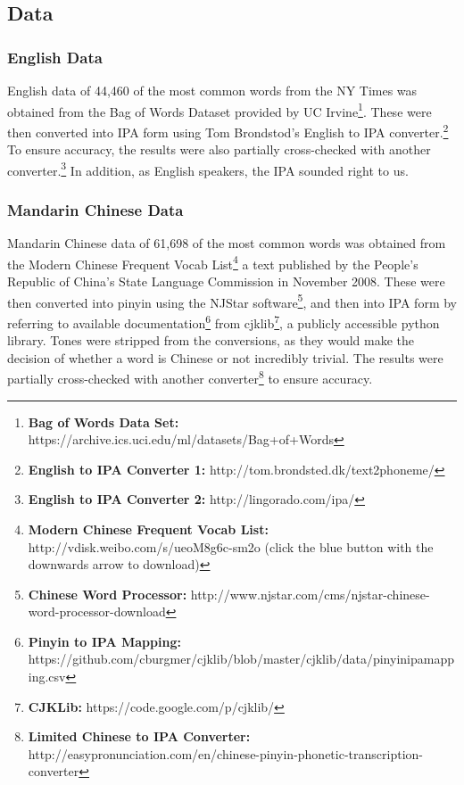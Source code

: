 \documentclass[a4paper]{article}
\begin{document}
\subsection{Data}
\subsubsection{English Data}
English data of 44,460 of the most common words from the NY Times was obtained from the Bag of Words Dataset provided by UC Irvine\footnote{\textbf{Bag of Words Data Set:} https://archive.ics.uci.edu/ml/datasets/Bag+of+Words}. These were then converted into IPA form using Tom Brondstod's English to IPA converter.\footnote{\textbf{English to IPA Converter 1:} http://tom.brondsted.dk/text2phoneme/} To ensure accuracy, the results were also partially cross-checked with another converter.\footnote{\textbf{English to IPA Converter 2: }http://lingorado.com/ipa/} In addition, as English speakers, the IPA sounded right to us.
\subsubsection{Mandarin Chinese Data}
Mandarin Chinese data of 61,698 of the most common words was obtained from the Modern Chinese Frequent Vocab List\footnote{\textbf{Modern Chinese Frequent Vocab List: }http://vdisk.weibo.com/s/ueoM8g6c-sm2o (click the blue button with the downwards arrow to download)} a text published by the People's Republic of China's State Language Commission in November 2008. These were then converted into pinyin using the NJStar software\footnote{\textbf{Chinese Word Processor: }http://www.njstar.com/cms/njstar-chinese-word-processor-download}, and then into IPA form by referring to available documentation\footnote{\textbf{Pinyin to IPA Mapping:} https://github.com/cburgmer/cjklib/blob/master/cjklib/data/pinyinipamapping.csv} from cjklib\footnote{\textbf{CJKLib: }https://code.google.com/p/cjklib/}, a publicly accessible python library. Tones were stripped from the conversions, as they would make the decision of whether a word is Chinese or not incredibly trivial. The results were partially cross-checked with another converter\footnote{\textbf{Limited Chinese to IPA Converter: }http://easypronunciation.com/en/chinese-pinyin-phonetic-transcription-converter} to ensure accuracy.
\end{document}
